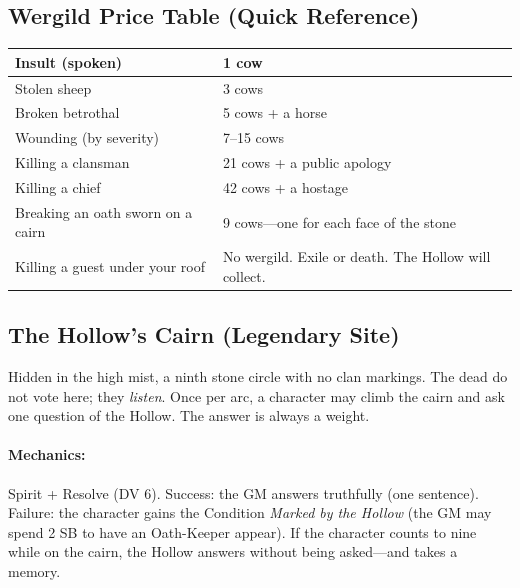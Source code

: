 \subsection*{Wergild Price Table (Quick Reference)}
\begin{tcolorbox}[colback=black!3,colframe=black!40!white,title={Blood Prices (in cattle, unless noted)},breakable]
\small
\begin{tabular}{|l|l|}
\hline
Insult (spoken) & 1 cow \\
\hline
Stolen sheep & 3 cows \\
\hline
Broken betrothal & 5 cows + a horse \\
\hline
Wounding (by severity) & 7--15 cows \\
\hline
Killing a clansman & 21 cows + a public apology \\
\hline
Killing a chief & 42 cows + a hostage \\
\hline
Breaking an oath sworn on a cairn & 9 cows---one for each face of the stone \\
\hline
Killing a guest under your roof & No wergild. Exile or death. The Hollow will collect. \\
\hline
\end{tabular}
\end{tcolorbox}

\subsection*{The Hollow's Cairn (Legendary Site)}
Hidden in the high mist, a ninth stone circle with no clan markings. The dead do not vote here; they \textit{listen}. Once per arc, a character may climb the cairn and ask one question of the Hollow. The answer is always a weight.

\paragraph{Mechanics:}
Spirit + Resolve (DV 6). Success: the GM answers truthfully (one sentence). Failure: the character gains the Condition \textit{Marked by the Hollow} (the GM may spend 2 SB to have an Oath-Keeper appear). If the character counts to nine while on the cairn, the Hollow answers without being asked---and takes a memory.

